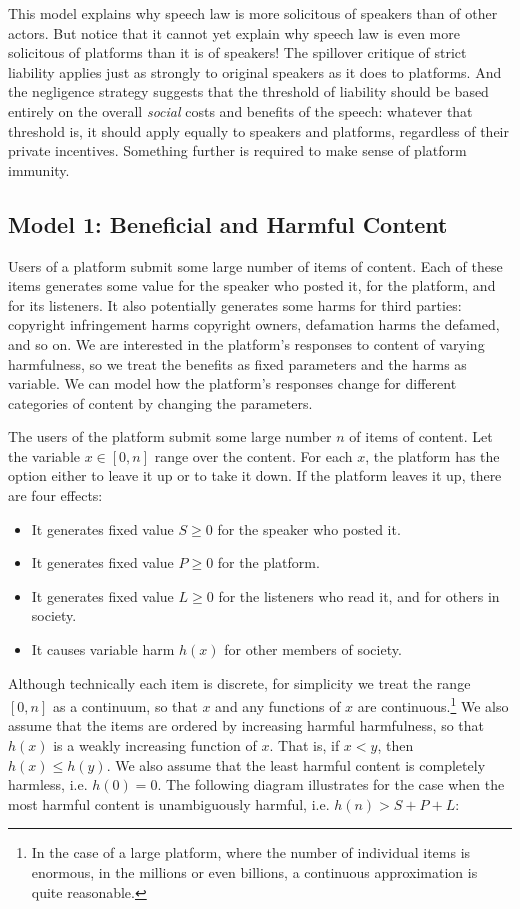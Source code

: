 This model explains why speech law is more solicitous of speakers than of other actors. But notice that it cannot yet explain why speech law is even more solicitous of platforms than it is of speakers! The spillover critique of strict liability applies just as strongly to original speakers as it does to platforms. And the negligence strategy suggests that the threshold of liability should be based entirely on the overall \emph{social} costs and benefits of the speech: whatever that threshold is, it should apply equally to speakers and platforms, regardless of their private incentives. Something further is required to make sense of platform immunity.




\subsection{Model 1: Beneficial and Harmful Content}

Users of a platform submit some large number of items of content. Each of these items generates some value for the speaker who posted it, for the platform, and for its listeners. It also potentially generates some harms for third parties: copyright infringement harms copyright owners, defamation harms the defamed, and so on. We are interested in the platform's responses to content of varying harmfulness, so we treat the benefits as fixed parameters and the harms as variable. We can model how the platform's responses change for different categories of content by changing the parameters.

The users of the platform submit some large number $n$ of items of content. Let the variable $x \in [0,n]$ range over the content. For each $x$, the platform has the option either to leave it up or to take it down. If the platform leaves it up, there are four effects:
\begin{itemize}
\item It generates fixed value $S \ge 0$ for the speaker who posted it.
\item It generates fixed value $P \ge 0$ for the platform.
\item It generates fixed value $L \ge 0$ for the listeners who read it, and for others in society.
\item It causes variable harm $h(x)$ for other members of society.
\end{itemize}
Although technically each item is discrete, for simplicity we treat the range $[0,n]$ as a continuum, so that $x$ and any functions of $x$ are continuous.\footnote{In the  case of a large platform, where the number of individual items is enormous, in the millions or even billions, a continuous approximation is quite reasonable.} We also assume that the items are ordered by increasing harmful harmfulness, so that $h(x)$ is a weakly increasing function of $x$. That is, if $x < y$, then $h(x) \le h(y)$. We also assume that the least harmful content is completely harmless, i.e. $h(0) = 0$. The following diagram illustrates for the case when the most harmful content is unambiguously harmful, i.e.  $h(n) > S + P + L$:

